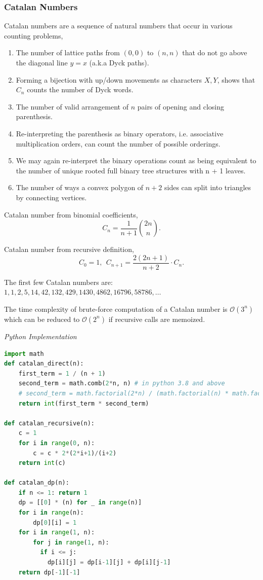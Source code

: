 \documentclass{article}
\newcommand{\bigO}{\mathcal{O}}
\begin{document}
    \subsubsection{Catalan Numbers}
    Catalan numbers are a sequence of natural numbers that occur in various counting problems,
    \begin{enumerate}
        \item The number of lattice paths from $(0, 0)$ to $(n, n)$ that do not go above the diagonal line $y = x$ (a.k.a Dyck paths).
        
        \item Forming a bijection with up/down movements as characters $X, Y$, shows that $C_n$ counts the number of Dyck words.
        
        \item The number of valid arrangement of $n$ pairs of opening and closing parenthesis.
        
        \item Re-interpreting the parenthesis as binary operators, i.e. associative multiplication orders, can count the number of possible orderings. 
        
        \item We may again re-interpret the binary operations count as being equivalent to the number of unique rooted full binary tree structures with n + 1 leaves.
        
        \item The number of ways a convex polygon of $n+2$ sides can split into triangles by connecting vertices.
    \end{enumerate}
    Catalan number from binomial coefficients,
    \[
        C_n = \frac{1}{n+1}\binom{2n}{n}.
    \]
    
    Catalan number from recursive definition,
    \[
    C_0 = 1,\ \ C_{n+1} = \frac{2(2n+1)}{n+2} \cdot C_n. 
    \]
    
    The first few Catalan numbers are: $1, 1, 2, 5, 14, 42, 132, 429, 1430, 4862, 16796, 58786, \dots$ 
    
    The time complexity of brute-force computation of a Catalan number is $\bigO(3^n)$ which can be reduced to $\bigO(2^n)$ if recursive calls are memoized.

\vspace{8pt} \emph{Python Implementation}
\begin{lstlisting}[language=Python]
import math  
def catalan_direct(n):
    first_term = 1 / (n + 1)
    second_term = math.comb(2*n, n) # in python 3.8 and above
    # second_term = math.factorial(2*n) / (math.factorial(n) * math.factorial(2*n-n))
    return int(first_term * second_term)

def catalan_recursive(n):
    c = 1
    for i in range(0, n):
        c = c * 2*(2*i+1)/(i+2)
    return int(c)

def catalan_dp(n):
    if n <= 1: return 1
    dp = [[0] * (n) for _ in range(n)] 
    for i in range(n):
        dp[0][i] = 1
    for i in range(1, n):
        for j in range(1, n):
          if i <= j: 
            dp[i][j] = dp[i-1][j] + dp[i][j-1]
    return dp[-1][-1] 
\end{lstlisting}
\end{document}
